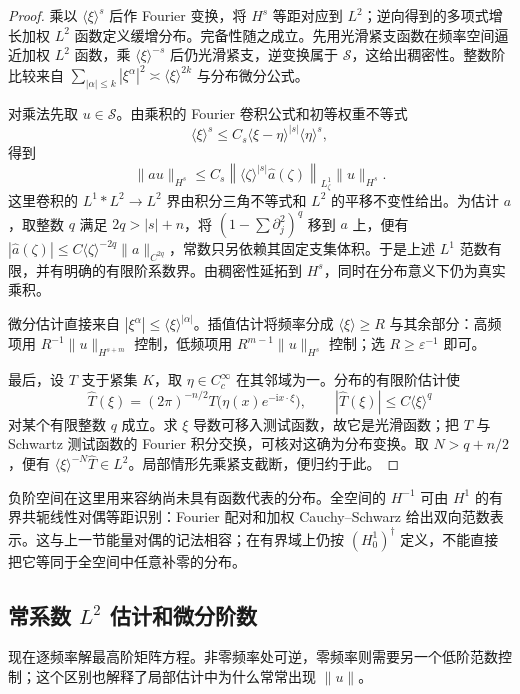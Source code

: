 \begin{proof}
	乘以 \(\langle\xi\rangle^s\) 后作 Fourier 变换，将 \(H^s\) 等距对应到 \(L^2\)；逆向得到的多项式增长加权 \(L^2\) 函数定义缓增分布。完备性随之成立。先用光滑紧支函数在频率空间逼近加权 \(L^2\) 函数，乘 \(\langle\xi\rangle^{-s}\) 后仍光滑紧支，逆变换属于 \(\mathcal S\)，这给出稠密性。整数阶比较来自
	\(\sum_{|\alpha|\le k}|\xi^\alpha|^2\asymp\langle\xi\rangle^{2k}\) 与分布微分公式。

	对乘法先取 \(u\in\mathcal S\)。由乘积的 Fourier 卷积公式和初等权重不等式
	\[
		\langle\xi\rangle^s\le C_s\langle\xi-\eta\rangle^{|s|}\langle\eta\rangle^s,
	\]
	得到
	\[
		\|au\|_{H^s}\le C_s\left\|\langle\zeta\rangle^{|s|}\widehat a(\zeta)\right\|_{L^1_\zeta}\|u\|_{H^s}.
	\]
	这里卷积的 \(L^1*L^2\to L^2\) 界由积分三角不等式和 \(L^2\) 的平移不变性给出。为估计 \(a\)，取整数 \(q\) 满足 \(2q>|s|+n\)，将 \((1-\sum\partial_j^2)^q\) 移到 \(a\) 上，便有
	\(|\widehat a(\zeta)|\le C\langle\zeta\rangle^{-2q}\|a\|_{C^{2q}}\)，常数只另依赖其固定支集体积。于是上述 \(L^1\) 范数有限，并有明确的有限阶系数界。由稠密性延拓到 \(H^s\)，同时在分布意义下仍为真实乘积。

	微分估计直接来自 \(|\xi^\alpha|\le\langle\xi\rangle^{|\alpha|}\)。插值估计将频率分成 \(\langle\xi\rangle\ge R\) 与其余部分：高频项用 \(R^{-1}\|u\|_{H^{s+m}}\) 控制，低频项用 \(R^{m-1}\|u\|_{H^s}\) 控制；选 \(R\ge\varepsilon^{-1}\) 即可。

	最后，设 \(T\) 支于紧集 \(K\)，取 \(\eta\in C_c^\infty\) 在其邻域为一。分布的有限阶估计使
	\[
		\widehat T(\xi)=(2\pi)^{-n/2}T\bigl(\eta(x)e^{-\mathrm ix\cdot\xi}\bigr),
		\qquad |\widehat T(\xi)|\le C\langle\xi\rangle^q
	\]
	对某个有限整数 \(q\) 成立。求 \(\xi\) 导数可移入测试函数，故它是光滑函数；把 \(T\) 与 Schwartz 测试函数的 Fourier 积分交换，可核对这确为分布变换。取 \(N>q+n/2\)，便有 \(\langle\xi\rangle^{-N}\widehat T\in L^2\)。局部情形先乘紧支截断，便归约于此。
\end{proof}

负阶空间在这里用来容纳尚未具有函数代表的分布。全空间的 \(H^{-1}\) 可由 \(H^1\) 的有界共轭线性对偶等距识别：Fourier 配对和加权 Cauchy--Schwarz 给出双向范数表示。这与上一节能量对偶的记法相容；在有界域上仍按 \((H_0^1)^\dagger\) 定义，不能直接把它等同于全空间中任意补零的分布。

\subsection{\texorpdfstring{常系数 \(L^2\) 估计和微分阶数}{常系数 L² 估计和微分阶数}}
\label{g3:subsec:1202:04}
现在逐频率解最高阶矩阵方程。非零频率处可逆，零频率则需要另一个低阶范数控制；这个区别也解释了局部估计中为什么常常出现 \(\|u\|\)。

